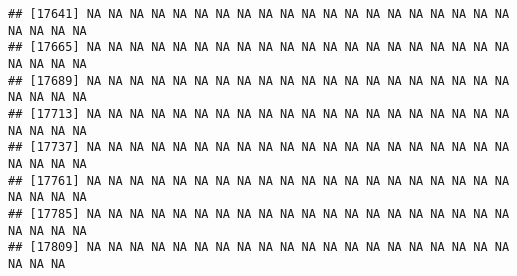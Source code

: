 \documentclass[
]{article}
\newenvironment{Shaded}{\begin{snugshade}}{\end{snugshade}}
\newcommand{\NormalTok}[1]{#1}
\newcommand{\SpecialCharTok}[1]{\textcolor[rgb]{0.00,0.00,0.00}{#1}}
\begin{document}
\begin{verbatim}
## [17641] NA NA NA NA NA NA NA NA NA NA NA NA NA NA NA NA NA NA NA NA NA NA NA NA
## [17665] NA NA NA NA NA NA NA NA NA NA NA NA NA NA NA NA NA NA NA NA NA NA NA NA
## [17689] NA NA NA NA NA NA NA NA NA NA NA NA NA NA NA NA NA NA NA NA NA NA NA NA
## [17713] NA NA NA NA NA NA NA NA NA NA NA NA NA NA NA NA NA NA NA NA NA NA NA NA
## [17737] NA NA NA NA NA NA NA NA NA NA NA NA NA NA NA NA NA NA NA NA NA NA NA NA
## [17761] NA NA NA NA NA NA NA NA NA NA NA NA NA NA NA NA NA NA NA NA NA NA NA NA
## [17785] NA NA NA NA NA NA NA NA NA NA NA NA NA NA NA NA NA NA NA NA NA NA NA NA
## [17809] NA NA NA NA NA NA NA NA NA NA NA NA NA NA NA NA NA NA NA NA NA NA NA
\end{verbatim}

\begin{Shaded}
\end{Shaded}
\end{document}
